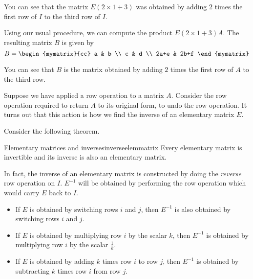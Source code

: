 \begin{solution}
You can see that the matrix $E\left( 2 \times 1+3\right)$ was obtained by adding $2$ times the first row
of $I$ to the third row of $I$. 

Using our usual procedure, we can compute the product $E\left( 2 \times 1+3\right)A$. The resulting 
matrix $B$ is given by 
\begin{equation*}
B = \begin{mymatrix}{cc}
a & b \\
c & d \\
2a+e & 2b+f
\end{mymatrix}
\end{equation*}

You can see that $B$ is the matrix obtained by adding $2$ times the first row of $A$ to the third row. 
\end{solution}

Suppose we have applied a row operation to a matrix $A$. Consider the row operation required to return $A$ to its original form, to undo
the row operation. It turns out that this action is how we find the inverse of an elementary matrix $E$. 

Consider the following theorem.

\begin{theorem}{Elementary matrices and inverses}{inverseelemmatrix}
Every elementary matrix is invertible and its inverse is also an elementary matrix.
\end{theorem}

In fact, the inverse of an elementary matrix is constructed by doing the {\em reverse \em}row operation on $I$. $E^{-1}$ will
be obtained by performing the row operation which would carry $E$ back to $I$. 

\begin{itemize}
\item If $E$ is obtained by switching rows $i$ and $j$, then $E^{-1}$ is also obtained by switching rows $i$ and $j$. 

\item If $E$ is obtained by multiplying row $i$ by the scalar $k$, then $E^{-1}$ is obtained by multiplying row $i$ by
the scalar $\frac{1}{k}$. 

\item If $E$ is obtained by adding $k$ times row $i$ to row $j$, then $E^{-1}$ is obtained by 
subtracting $k$ times row $i$ from row $j$.
\end{itemize} 

